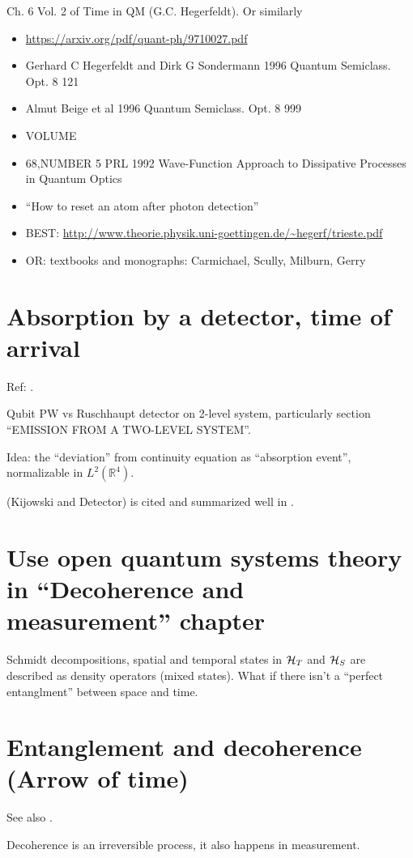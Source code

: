 Ch. 6 Vol. 2 of Time in QM (G.C. Hegerfeldt). Or similarly
\begin{itemize}
  \item \url{https://arxiv.org/pdf/quant-ph/9710027.pdf}
  \item Gerhard C Hegerfeldt and Dirk G Sondermann 1996 Quantum Semiclass. Opt. 8 121
  \item  Almut Beige et al 1996 Quantum Semiclass. Opt. 8 999
  \item VOLUME
  \item 68,NUMBER 5 PRL 1992 Wave-Function Approach to Dissipative Processes in Quantum Optics
  \item ``How to reset an atom after photon detection'' 
  \item BEST: \url{http://www.theorie.physik.uni-goettingen.de/~hegerf/trieste.pdf}
  \item OR: textbooks and monographs: Carmichael, Scully, Milburn, Gerry
\end{itemize}


\section{Absorption by a detector, time of arrival}
Ref: \cite{RuschhauptAbsorption}.

Qubit PW vs Ruschhaupt detector on 2-level system,
particularly section “EMISSION FROM A TWO-LEVEL SYSTEM”.

Idea: the ``deviation'' from continuity equation as ``absorption event'',
normalizable in $L^2(\mathbb{R}^4)$.

\cite{TQM2} (Kijowski and Detector) is cited and summarized well in
\cite{Halliwell_Detector}.

\section{Use open quantum systems theory in ``Decoherence and measurement'' chapter}
Schmidt decompositions, spatial and temporal states in
$\mathcal{H}_T$ and $\mathcal{H}_S$
are described as density operators
(mixed states). What if there isn't a ``perfect entanglment'' between space and time.

\section{Entanglement and decoherence (Arrow of time)}
See also \cite{EntanglementVsDecoherence}.

Decoherence is an irreversible process, it also happens in measurement.

